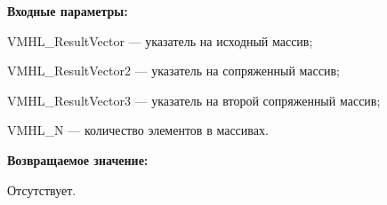 \textbf{Входные параметры:}
 
VMHL\_ResultVector --- указатель на исходный массив;
 
VMHL\_ResultVector2 --- указатель на сопряженный массив;
 
VMHL\_ResultVector3 --- указатель на второй сопряженный массив;
 
VMHL\_N --- количество элементов в массивах.

\textbf{Возвращаемое значение:}

Отсутствует.